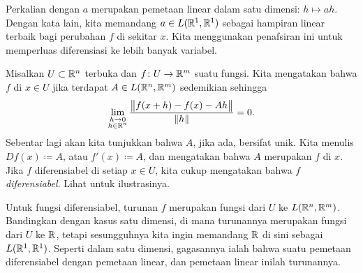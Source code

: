 Perkalian dengan $a$ merupakan pemetaan linear dalam satu dimensi:
$h \mapsto ah$.
Dengan kata lain,
kita memandang $a \in L({\mathbb{R}}^1,{\mathbb{R}}^1)$ sebagai
hampiran linear terbaik bagi
perubahan $f$ di sekitar $x$.  Kita menggunakan penafsiran ini
untuk memperluas diferensiasi ke lebih banyak variabel.

\begin{defn}
Misalkan $U \subset {\mathbb{R}}^n$ terbuka dan $f \colon U \to {\mathbb{R}}^m$ suatu fungsi.  Kita
mengatakan bahwa $f$ \emph{} di $x \in U$ jika terdapat
$A \in L({\mathbb{R}}^n,{\mathbb{R}}^m)$ sedemikian sehingga
\begin{equation*}
\lim_{\substack{h \to 0\\h\in {\mathbb{R}}^n}}
\frac{\bigl\lVert {f(x+h)-f(x) - Ah} \bigr\rVert}{\lVert {h} \rVert} = 0 .
\end{equation*}
Sebentar lagi akan kita tunjukkan bahwa $A$, jika ada, bersifat unik.
Kita menulis $Df(x) \coloneqq A$, atau $f'(x) \coloneqq A$, dan
mengatakan bahwa $A$ merupakan \emph{} $f$ di $x$.
Jika $f$ diferensiabel di
setiap $x \in U$, kita cukup mengatakan bahwa $f$ \emph{diferensiabel}.  Lihat
 untuk ilustrasinya.
\end{defn}

\begin{myfigureht}
\caption{Ilustrasi turunan untuk fungsi $f \colon \R^2 \to \R$.  Vektor $h$ ditampilkan
pada bidang $x_1x_2$ dengan pangkal di $(x_1,x_2)$, dan vektor
$Ah \in \R^1$ ditampilkan sepanjang arah $y$.\label{fig:svder}}
\end{myfigureht}

Untuk fungsi diferensiabel,
turunan $f$ merupakan fungsi dari $U$ ke $L({\mathbb{R}}^n,{\mathbb{R}}^m)$.  Bandingkan
dengan kasus satu dimensi, di mana turunannya merupakan fungsi
dari $U$ ke ${\mathbb{R}}$, tetapi sesungguhnya kita ingin memandang ${\mathbb{R}}$ di sini sebagai
$L({\mathbb{R}}^1,{\mathbb{R}}^1)$.  Seperti dalam satu dimensi, gagasannya ialah bahwa suatu
pemetaan diferensiabel  dengan pemetaan linear, dan
pemetaan linear inilah turunannya.

